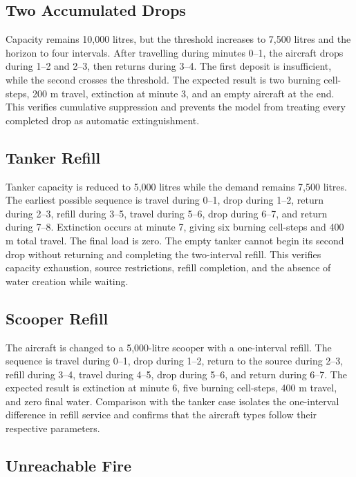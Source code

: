 \subsection{Two Accumulated Drops}

Capacity remains 10,000 litres, but the threshold increases to 7,500 litres and the horizon to four intervals. After travelling during minutes 0--1, the aircraft drops during 1--2 and 2--3, then returns during 3--4. The first deposit is insufficient, while the second crosses the threshold. The expected result is two burning cell-steps, 200 m travel, extinction at minute 3, and an empty aircraft at the end. This verifies cumulative suppression and prevents the model from treating every completed drop as automatic extinguishment.

\subsection{Tanker Refill}

Tanker capacity is reduced to 5,000 litres while the demand remains 7,500 litres. The earliest possible sequence is travel during 0--1, drop during 1--2, return during 2--3, refill during 3--5, travel during 5--6, drop during 6--7, and return during 7--8. Extinction occurs at minute 7, giving six burning cell-steps and 400 m total travel. The final load is zero. The empty tanker cannot begin its second drop without returning and completing the two-interval refill. This verifies capacity exhaustion, source restrictions, refill completion, and the absence of water creation while waiting.

\subsection{Scooper Refill}

The aircraft is changed to a 5,000-litre scooper with a one-interval refill. The sequence is travel during 0--1, drop during 1--2, return to the source during 2--3, refill during 3--4, travel during 4--5, drop during 5--6, and return during 6--7. The expected result is extinction at minute 6, five burning cell-steps, 400 m travel, and zero final water. Comparison with the tanker case isolates the one-interval difference in refill service and confirms that the aircraft types follow their respective parameters.

\subsection{Unreachable Fire}

